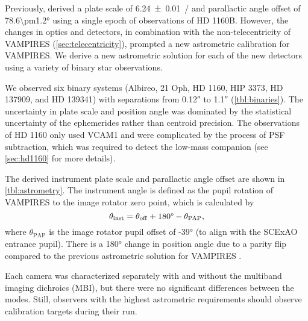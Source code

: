 Previously, \citet{currie_images_2022} derived a plate scale of \SI{6.24\pm0.01}{\mas/\pixel} and parallactic angle offset of \ang{78.6\pm1.2} using a single epoch of observations of HD 1160B.  However, the changes in optics and detectors, in combination with the non-telecentricity of VAMPIRES (\autoref{sec:telecentricity}), prompted a new astrometric calibration for VAMPIRES.  We derive a new astrometric solution for each of the new detectors using a variety of binary star observations.

We observed six binary systems (Albireo, 21 Oph, HD 1160, HIP 3373, HD 137909, and HD 139341) with separations from \ang{;;0.12} to \ang{;;1.1} (\autoref{tbl:binaries}). The uncertainty in plate scale and position angle was dominated by the statistical uncertainty of the ephemerides rather than centroid precision. The observations of HD 1160 only used VCAM1 and were complicated by the process of PSF subtraction, which was required to detect the low-mass companion (see \autoref{sec:hd1160} for more details).

The derived instrument plate scale and parallactic angle offset are shown in \autoref{tbl:astrometry}. The instrument angle is defined as the pupil rotation of VAMPIRES to the image rotator zero point, which is calculated by
\begin{equation}
    \theta_\mathrm{inst} = \theta_\mathrm{off} + 180\text{\textdegree} - \theta_\mathrm{PAP},
\end{equation}
where $\theta_\mathrm{PAP}$ is the image rotator pupil offset of \ang{-39} (to align with the SCExAO entrance pupil). There is a \ang{180} change in position angle due to a parity flip compared to the previous astrometric solution for VAMPIRES \citep{currie_images_2022}.

Each camera was characterized separately with and without the multiband imaging dichroics (MBI), but there were no significant differences between the modes. Still, observers with the highest astrometric requirements should observe calibration targets during their run.


